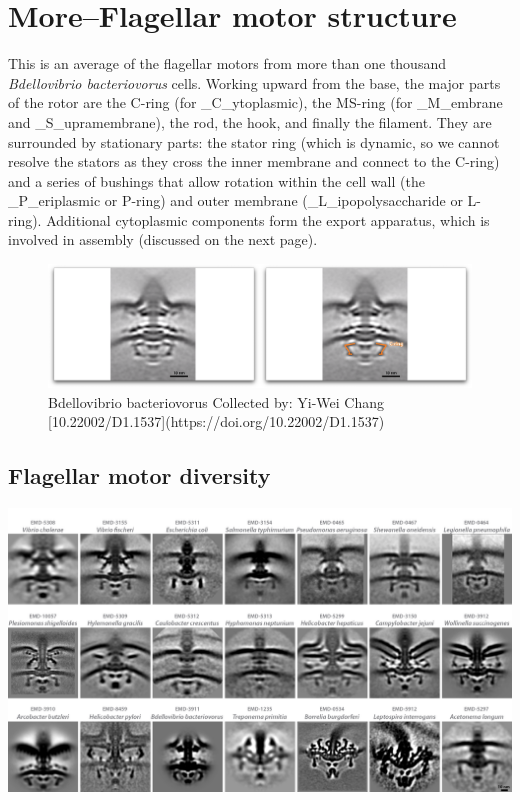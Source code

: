 \documentclass[]{tufte-book}
\begin{document}
\hypertarget{moreflagellar-motor-structure}{\section{More--Flagellar
motor structure}\label{moreflagellar-motor-structure}}

This is an average of the flagellar motors from more than one thousand
\emph{Bdellovibrio bacteriovorus} cells. Working upward from the base,
the major parts of the rotor are the C-ring (for \_C\_ytoplasmic), the
MS-ring (for \_M\_embrane and \_S\_upramembrane), the rod, the hook, and
finally the filament. They are surrounded by stationary parts: the
stator ring (which is dynamic, so we cannot resolve the stators as they
cross the inner membrane and connect to the C-ring) and a series of
bushings that allow rotation within the cell wall (the \_P\_eriplasmic
or P-ring) and outer membrane (\_L\_ipopolysaccharide or L-ring).
Additional cytoplasmic components form the export apparatus, which is
involved in assembly (discussed on the next page).

\begin{figure}
\includegraphics{movie_stills/6_2a} \caption[Bdellovibrio bacteriovorus Collected by]{Bdellovibrio bacteriovorus Collected by: Yi-Wei Chang [10.22002/D1.1537](https://doi.org/10.22002/D1.1537)}\label{fig:unnamed-chunk-102}
\end{figure}

\subsection{Flagellar motor diversity}\label{Flagellar_motor_diversity}

\includegraphics{img/schematics/6_2_1}
\end{document}
